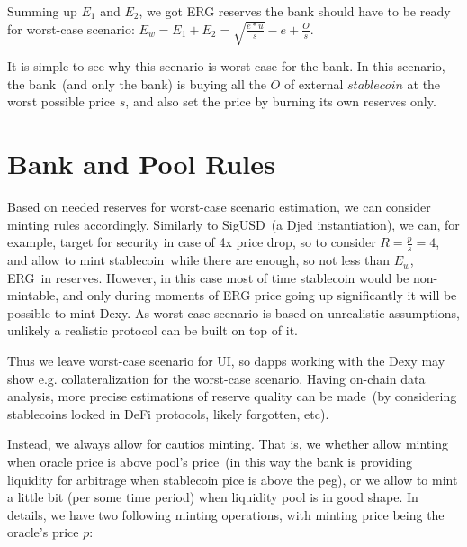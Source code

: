 \documentclass{article}   %
\newcommand{\bc}{ERG}
\newcommand{\sct}{stablecoin}
\newcommand{\dx}{Dexy}
\begin{document}
Summing up $E_1$ and $E_2$, we got \bc{} reserves the bank should have to be ready for worst-case scenario: $E_w = E_1 + E_2 = \sqrt{\frac{e * u}{s}} - e + \frac{O}{s}$.

It is simple to see why this scenario is worst-case for the bank. In this scenario, the bank~(and only the bank) is buying all the $O$ of external $\sct{}$ at the worst possible price $s$, and also set the price by burning its own reserves only.  

\section{Bank and Pool Rules}

Based on needed reserves for worst-case scenario estimation, we can consider minting rules accordingly. Similarly to SigUSD~(a Djed instantiation), we can, for example, target for security in case of 
4x price drop, so to consider $R = \frac{p}{s} = 4$, and allow to mint \sct{}~while there are enough, so not less than $E_w$, \bc{}~in reserves. However, in this case most of time \sct{} would be non-mintable, and only during moments of \bc{} price going up significantly it will be possible to mint \dx{}. As worst-case scenario is based on unrealistic assumptions, unlikely a realistic protocol can be built on top of it.  

Thus we leave worst-case scenario for UI, so dapps working with the \dx{} may show e.g. collateralization for the worst-case scenario. Having on-chain data analysis, more precise estimations of reserve quality can be made~(by considering \sct{}s locked in DeFi protocols, likely forgotten, etc).

Instead, we always allow for cautios minting. That is, we whether allow minting when oracle price is above pool's price~(in this way the bank is providing liquidity for arbitrage when \sct{} pice is above the peg), or we allow to mint a little bit (per some time period) when liquidity pool is in good shape. In details, we have two following minting operations, with minting price being the oracle's price $p$:  
\end{document}
